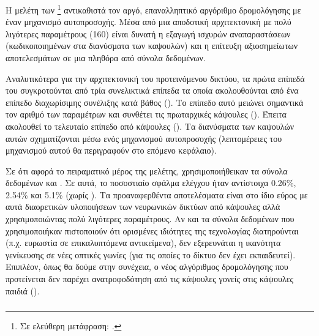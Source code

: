 \subsubsection{}

Η μελέτη των  \footnote{Σε ελεύθερη μετάφραση: .} \cite{mazzia2021efficient} αντικαθιστά τον αργό, επαναλληπτικό αργόριθμο δρομολόγησης με έναν μηχανισμό αυτοπροσοχής. Μέσα από μια αποδοτική αρχιτεκτονική με πολύ λιγότερες παραμέτρους (160) είναι δυνατή η εξαγωγή ισχυρών αναπαραστάσεων (κωδικοποιημένων στα διανύσματα των καψουλών) και η επίτευξη αξιοσημείωτων αποτελεσμάτων σε μια πληθόρα από σύνολα δεδομένων.\par

 Αναλυτικότερα για την αρχιτεκτονική του προτεινόμενου δικτύου, τα πρώτα επίπεδά του συγκροτούνται από τρία συνελικτικά επίπεδα τα οποία ακολουθούνται από ένα επίπεδο διαχωρίσιμης συνέλιξης κατά βάθος (). Το επίπεδο αυτό μειώνει σημαντικά τον αριθμό των παραμέτρων και συνθέτει τις πρωταρχικές κάψουλες (). Έπειτα ακολουθεί το τελευταίο επίπεδο από κάψουλες  (). Τα διανύσματα των καψουλών αυτών σχηματίζονται μέσω ενός μηχανισμού αυτο\textendash προσοχής (λεπτομέρειες του μηχανισμού αυτού θα περιγραφούν στο επόμενο κεφάλαιο).\par

 Σε ότι αφορά το πειραματικό μέρος της μελέτης, χρησιμοποιήθεικαν τα σύνολα δεδομένων  και . Σε αυτά, το ποσοστιαίο σφάλμα ελέγχου ήταν αντίστοιχα 0.26\%, 2.54\% και 5.1\% (χωρίς ). Τα προαναφερθέντα αποτελέσματα είναι στο ίδιο εύρος με αυτά διαορετικών υλοποιήσεων των νευρωνικών δικτύων από κάψουλες αλλά χρησιμοποιώντας πολύ λιγότερες παραμέτρους. Αν και τα σύνολα δεδομένων που χρησιμοποιήκαν πιστοποιούν ότι ορισμένες ιδιότητες της τεχνολογίας διατηρούνται (π.χ. ευρωστία σε επικαλυπτόμενα αντικείμενα), δεν εξερευνάται η ικανότητα γενίκευσης σε νέες οπτικές γωνίες (για τις οποίες το δίκτυο δεν έχει εκπαιδευτεί). Επιπλέον, όπως θα δούμε στην συνέχεια, ο νέος αλγόριθμος δρομολόγησης που προτείνεται δεν παρέχει ανατροφοδότηση από τις κάψουλες γονείς στις κάψουλες παιδιά ().

 \subsubsection{}

